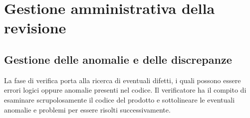 %


\section{Gestione amministrativa della revisione}

	\subsection{Gestione delle anomalie e delle discrepanze}
	La fase di verifica porta alla ricerca di eventuali difetti, i quali possono essere errori logici oppure anomalie presenti nel codice. Il verificatore ha il compito di esaminare scrupolosamente il codice del prodotto e sottolineare le eventuali anomalie e problemi per essere risolti successivamente.
	
